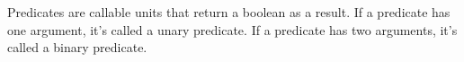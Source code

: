 Predicates are callable units that return a boolean as a result. If a predicate has one argument, it’s called a unary predicate. If a predicate has two arguments, it’s called a binary predicate.